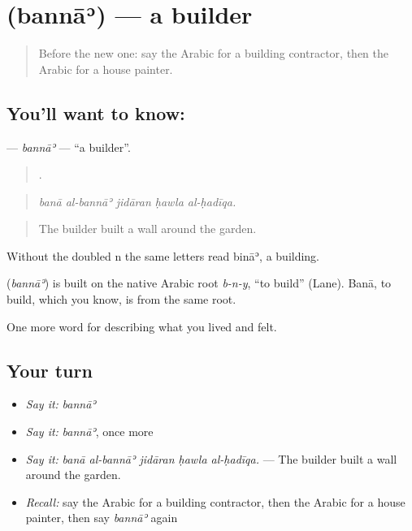 \section[\texorpdfstring{\ar{بناء} (bannāʾ)}{بناء (bannāʾ)}]{ (bannāʾ) — a builder}

\label{lesson:AR-C526-banna}



\begin{quote}
Before the new one: say the Arabic for a building contractor, then the Arabic for a house painter.
\end{quote}

\subsection*{You'll want to know: }
\textbf{} — \emph{bannāʾ} — \textquotedblleft{}a builder\textquotedblright{}.

\begin{quote}
    .
\end{quote}

\begin{quote}
\emph{banā al-bannāʾ jidāran ḥawla al-ḥadīqa.}
\end{quote}

\begin{quote}
The builder built a wall around the garden.
\end{quote}

Without the doubled n the same letters read bināʾ, a building.

\begin{cousinweb}
\textbf{} (\emph{bannāʾ}) is built on the native Arabic root \emph{b-n-y}, \textquotedblleft{}to build\textquotedblright{} (Lane). Banā, to build, which you know, is from the same root.
\end{cousinweb}

\begin{grammarlens}[title={What you've built}]
One more word for describing what you lived and felt.
\end{grammarlens}

\subsection*{Your turn}
\begin{itemize}
\raggedright
  \item \emph{Say it:} \emph{bannāʾ}
  \item \emph{Say it:} \emph{bannāʾ}, once more
  \item \emph{Say it:} \emph{banā al-bannāʾ jidāran ḥawla al-ḥadīqa.} — The builder built a wall around the garden.
  \item \emph{Recall:} say the Arabic for a building contractor, then the Arabic for a house painter, then say \emph{bannāʾ} again
\end{itemize}

